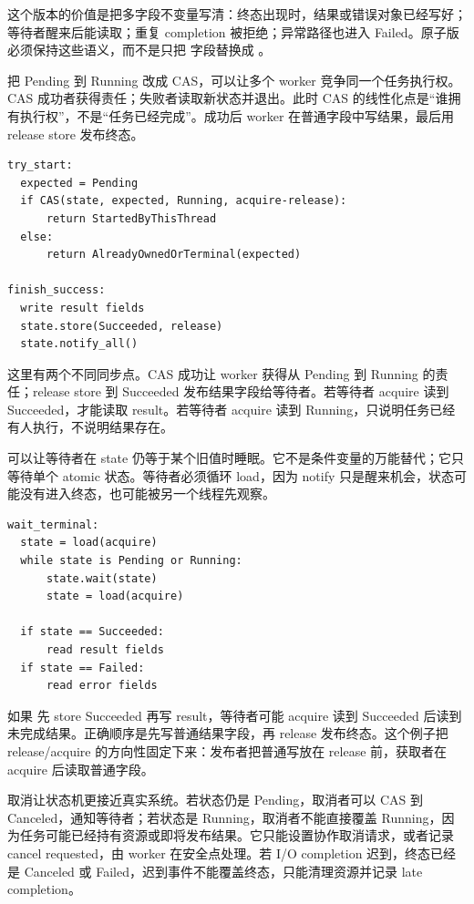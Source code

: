这个版本的价值是把多字段不变量写清：终态出现时，结果或错误对象已经写好；等待者醒来后能读取；重复 completion 被拒绝；异常路径也进入 Failed。原子版必须保持这些语义，而不是只把  字段替换成 。

把 Pending 到 Running 改成 CAS，可以让多个 worker 竞争同一个任务执行权。CAS 成功者获得责任；失败者读取新状态并退出。此时 CAS 的线性化点是“谁拥有执行权”，不是“任务已经完成”。成功后 worker 在普通字段中写结果，最后用 release store 发布终态。

\begin{lstlisting}[numbers=none,caption={CAS 获得执行权的语义伪代码}]
try_start:
  expected = Pending
  if CAS(state, expected, Running, acquire-release):
      return StartedByThisThread
  else:
      return AlreadyOwnedOrTerminal(expected)

finish_success:
  write result fields
  state.store(Succeeded, release)
  state.notify_all()
\end{lstlisting}

这里有两个不同同步点。CAS 成功让 worker 获得从 Pending 到 Running 的责任；release store 到 Succeeded 发布结果字段给等待者。若等待者 acquire 读到 Succeeded，才能读取 result。若等待者 acquire 读到 Running，只说明任务已经有人执行，不说明结果存在。

 可以让等待者在 state 仍等于某个旧值时睡眠。它不是条件变量的万能替代；它只等待单个 atomic 状态。等待者必须循环 load，因为 notify 只是醒来机会，状态可能没有进入终态，也可能被另一个线程先观察。

\begin{lstlisting}[numbers=none,caption={等待终态的语义伪代码}]
wait_terminal:
  state = load(acquire)
  while state is Pending or Running:
      state.wait(state)
      state = load(acquire)

  if state == Succeeded:
      read result fields
  if state == Failed:
      read error fields
\end{lstlisting}

如果  先 store Succeeded 再写 result，等待者可能 acquire 读到 Succeeded 后读到未完成结果。正确顺序是先写普通结果字段，再 release 发布终态。这个例子把 release/acquire 的方向性固定下来：发布者把普通写放在 release 前，获取者在 acquire 后读取普通字段。

取消让状态机更接近真实系统。若状态仍是 Pending，取消者可以 CAS 到 Canceled，通知等待者；若状态是 Running，取消者不能直接覆盖 Running，因为任务可能已经持有资源或即将发布结果。它只能设置协作取消请求，或者记录 cancel requested，由 worker 在安全点处理。若 I/O completion 迟到，终态已经是 Canceled 或 Failed，迟到事件不能覆盖终态，只能清理资源并记录 late completion。

